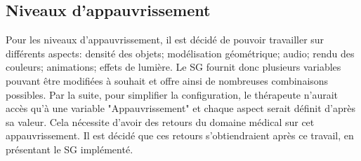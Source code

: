 	\subsection*{Niveaux d'appauvrissement}
		Pour les niveaux d'appauvrissement, il est décidé de pouvoir travailler sur différents aspects: densité des objets; modélisation géométrique; audio; rendu des couleurs; animations; effets de lumière. Le SG fournit donc plusieurs variables pouvant être modifiées à souhait et offre ainsi de nombreuses combinaisons possibles. Par la suite, pour simplifier la configuration, le thérapeute n'aurait accès qu'à une variable "Appauvrissement" et chaque aspect serait définit d'après sa valeur. Cela nécessite d'avoir des retours du domaine médical sur cet appauvrissement. Il est décidé que ces retours s'obtiendraient après ce travail, en présentant le SG implémenté.
		
